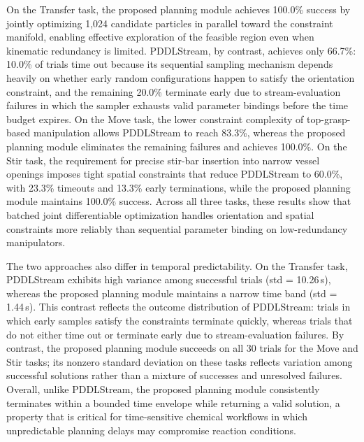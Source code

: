 \documentclass{ieeeaccess}
\begin{document}
On the Transfer task, the proposed planning module achieves 100.0\% success by jointly optimizing 1,024 candidate particles in parallel toward the constraint manifold, enabling effective exploration of the feasible region even when kinematic redundancy is limited. PDDLStream, by contrast, achieves only 66.7\%: 10.0\% of trials time out because its sequential sampling mechanism depends heavily on whether early random configurations happen to satisfy the orientation constraint, and the remaining 20.0\% terminate early due to stream-evaluation failures in which the sampler exhausts valid parameter bindings before the time budget expires. On the Move task, the lower constraint complexity of top-grasp-based manipulation allows PDDLStream to reach 83.3\%, whereas the proposed planning module eliminates the remaining failures and achieves 100.0\%. On the Stir task, the requirement for precise stir-bar insertion into narrow vessel openings imposes tight spatial constraints that reduce PDDLStream to 60.0\%, with 23.3\% timeouts and 13.3\% early terminations, while the proposed planning module maintains 100.0\% success. Across all three tasks, these results show that batched joint differentiable optimization handles orientation and spatial constraints more reliably than sequential parameter binding on low-redundancy manipulators.

The two approaches also differ in temporal predictability. On the Transfer task, PDDLStream exhibits high variance among successful trials (std = 10.26\,s), whereas the proposed planning module maintains a narrow time band (std = 1.44\,s). This contrast reflects the outcome distribution of PDDLStream: trials in which early samples satisfy the constraints terminate quickly, whereas trials that do not either time out or terminate early due to stream-evaluation failures. By contrast, the proposed planning module succeeds on all 30 trials for the Move and Stir tasks; its nonzero standard deviation on these tasks reflects variation among successful solutions rather than a mixture of successes and unresolved failures. Overall, unlike PDDLStream, the proposed planning module consistently terminates within a bounded time envelope while returning a valid solution, a property that is critical for time-sensitive chemical workflows in which unpredictable planning delays may compromise reaction conditions.
\end{document}
